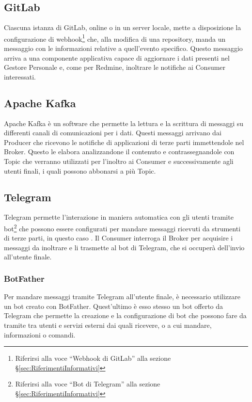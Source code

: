 		\subsection{GitLab}
		Ciascuna istanza di GitLab, online o in un server locale,
        mette a disposizione la configurazione di webhook\footnote{Riferirsi alla voce ``Webhook di GitLab'' alla sezione \S\ref{sec:RiferimentiInformativi}}
        che, alla modifica di una repository, manda un messaggio con le informazioni relative a quell'evento specifico.
        Questo messaggio arriva a una componente applicativa capace di
        aggiornare i dati presenti nel Gestore Personale e, come per Redmine, inoltrare le notifiche ai Consumer interessati.
		
		\subsection{Apache Kafka}
		Apache Kafka è un software  che permette la lettura e la scrittura di messaggi su differenti canali di comunicazioni per i dati.
		Questi messaggi arrivano dai Producer che ricevono le notifiche di applicazioni di terze parti immettendole nel Broker. Questo le elabora analizzandone
        il contenuto e contrassegnandole con Topic che verranno utilizzati per l'inoltro ai Consumer e successivamente agli utenti finali, i quali possono abbonarsi a più Topic.
		
		\subsection{Telegram}
		Telegram permette l'interazione in maniera automatica con gli utenti tramite
        bot\footnote{Riferirsi alla voce ``Bot di Telegram'' alla sezione \S\ref{sec:RiferimentiInformativi}}
        che possono essere configurati per mandare messaggi ricevuti da strumenti di terze parti, in questo caso \progetto.
        Il Consumer interroga il Broker per acquisire i messaggi da inoltrare e li trasmette al bot di Telegram, che si
        occuperà dell'invio all'utente finale.

		\subsubsection{BotFather}
		Per mandare messaggi tramite Telegram all'utente finale, è necessario utilizzare un bot creato con BotFather.
        Quest'ultimo è esso stesso un bot offerto da Telegram che permette la creazione e la configurazione di bot che
        possono fare da tramite tra utenti
        e servizi esterni dai quali ricevere, o a cui mandare, informazioni o comandi.

